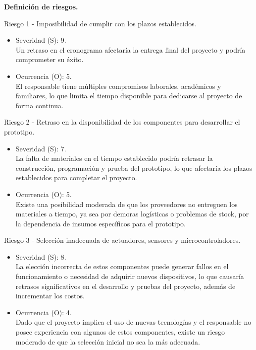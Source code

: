 \textbf{Definición de riesgos.}

Riesgo 1 - Imposibilidad de cumplir con los plazos establecidos.
\begin{itemize}
	\item Severidad (S): 9.\\ Un retraso en el cronograma afectaría la entrega final del
	      proyecto y podría comprometer su éxito.
	\item Ocurrencia (O): 5.\\ El responsable tiene múltiples compromisos laborales,
	      académicos y familiares, lo que limita el tiempo disponible para dedicarse al
	      proyecto de forma continua.
\end{itemize}

Riesgo 2 - Retraso en la disponibilidad de los componentes para desarrollar el
prototipo.
\begin{itemize}
	\item Severidad (S): 7.\\ La falta de materiales en el tiempo establecido podría
	      retrasar la construcción, programación y prueba del prototipo, lo que afectaría
	      los plazos establecidos para completar el proyecto.
	\item Ocurrencia (O): 5.\\ Existe una posibilidad moderada de que los proveedores no
	      entreguen los materiales a tiempo, ya sea por demoras logísticas o problemas de
	      stock, por la dependencia de insumos específicos para el prototipo.
\end{itemize}

Riesgo 3 - Selección inadecuada de actuadores, sensores y microcontroladores.
\begin{itemize}
	\item Severidad (S): 8.\\ La elección incorrecta de estos componentes puede generar
	      fallos en el funcionamiento o necesidad de adquirir nuevos dispositivos, lo que
	      causaría retrasos significativos en el desarrollo y pruebas del proyecto,
	      además de incrementar los costos.
	\item Ocurrencia (O): 4.\\ Dado que el proyecto implica el uso de nuevas tecnologías
	      y el responsable no posee experiencia con algunos de estos componentes, existe
	      un riesgo moderado de que la selección inicial no sea la más adecuada.
\end{itemize}

